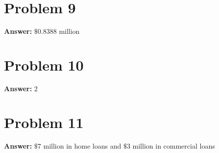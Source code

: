 \documentclass[11pt]{article}
\begin{document}
\section*{Problem 9}
\label{sec:org7ef28a5}

\textbf{Answer:} \(\$ 0.8388\) million
\section*{Problem 10}
\label{sec:orga403908}

\textbf{Answer:} 2
\section*{Problem 11}
\label{sec:orgbb6ad80}

\textbf{Answer:} \(\$ 7\) million in home loans and \(\$ 3\) million in commercial loans
\end{document}
